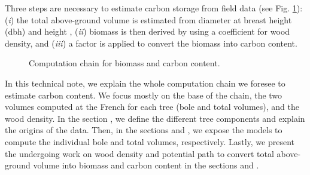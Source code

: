 Three steps are necessary to estimate carbon storage from field data (see Fig. \ref{fig::scheme}): (\textit{i}) the total above-ground volume is estimated from diameter at breast height (dbh) and height \parencite{Vallet2006}, (\textit{ii}) biomass is then derived by using a coefficient for wood density, and (\textit{iii}) a factor is applied to convert the biomass into carbon content. \\

\begin{figure}[h]
    \centering
	
	\caption{Computation chain for biomass and carbon content.\label{fig::scheme}}
\end{figure}

In this technical note, we explain the whole computation chain we foresee to estimate carbon content. We focus mostly on the base of the chain, \ie the two volumes computed at the French \NFI{} for each tree (bole and total volumes), and the wood density. In the section , we define the different tree components and explain the origins of the data. Then, in the sections  and , we expose the models to compute the individual bole and total volumes, respectively. Lastly, we present the undergoing work on wood density and potential path to convert total above-ground volume into biomass and carbon content in the sections  and .
